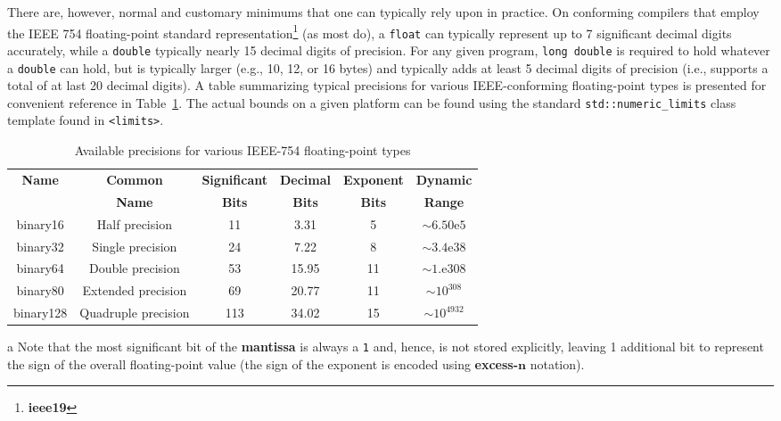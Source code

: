 There are, however, normal and customary minimums that one can typically
rely upon in practice. On conforming compilers that employ the IEEE 754
floating-point standard representation\footnote{\textbf{ieee19}} (as most do),
a \texttt{float} can typically represent up to 7 significant decimal
digits accurately, while a \texttt{double} typically nearly 15 decimal
digits of precision. For any given program,
\texttt{long}~\texttt{double} is required to hold whatever a
\texttt{double} can hold, but is typically larger (e.g., 10, 12, or 16
bytes) and typically adds at least 5 decimal digits of precision (i.e.,
supports a total of at last 20 decimal digits). A table summarizing
typical precisions for various IEEE-conforming floating-point types is
presented for convenient reference in Table~\ref{digitseparator-table3}. The actual bounds on a
given platform can be found using the standard
\texttt{std::numeric\_limits} class template found in \texttt{<limits>}.\pagebreak[4]
\begin{table}[h!] 
\begin{center}
\begin{threeparttable}
\caption{Available precisions for various IEEE-754 floating-point types}\label{digitseparator-table3}\vspace{1.5ex} 
{\small \begin{tabular}{c|c|c|c|c|c}\thickhline 
\rowcolor[gray]{.9}   {\sffamily\bfseries Name} & {\sffamily\bfseries Common} &
{\sffamily\bfseries Significant } & {\sffamily\bfseries Decimal }& {\sffamily\bfseries Exponent } & {\sffamily\bfseries Dynamic}\\
\rowcolor[gray]{.9}    & {\sffamily\bfseries Name} &
{\sffamily\bfseries Bits\tnote{a}} & {\sffamily\bfseries Bits}& {\sffamily\bfseries Bits} & {\sffamily\bfseries Range}\\ \hline 
binary16 & Half precision & 11 & 3.31 & 5 & $\sim6.50\text{e}5$\\ \hline
binary32 & Single precision & 24 & 7.22 & 8 & $\sim3.4\text{e}38$\\ \hline
binary64 & Double precision & 53 & 15.95 & 11 & $\sim1.\text{e}308$\\ \hline
\rule{0pt}{3.5mm}binary80 & Extended precision & 69 & 20.77 & 11 & $\sim10^{308}$\\ \hline
\rule{0pt}{3.5mm}binary128 & Quadruple precision & 113 & 34.02 & 15 & $\sim10^{4932}$\\ \hline
\end{tabular}
} %
\begin{tablenotes}{\footnotesize  
\item[a]{Note that the most significant bit of the \textbf{mantissa}
is always a \texttt{1} and, hence, is not stored explicitly, leaving 1
additional bit to represent the sign of the overall floating-point value
(the sign of the exponent is encoded using \textbf{excess-$\mathbf{n}$}
notation).} 
} %
\end{tablenotes} %
\end{threeparttable} 
\end{center}
\end{table}

